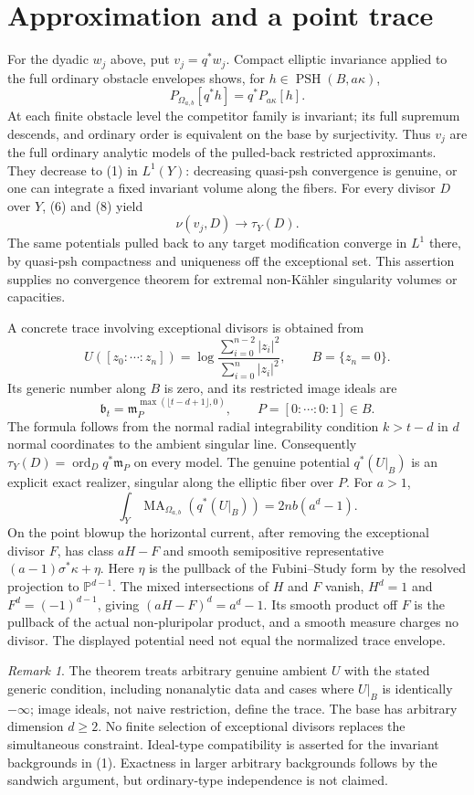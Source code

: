 \documentclass[11pt]{article}
\newcommand{\PSH}{\operatorname{PSH}}
\newcommand{\MA}{\operatorname{MA}}
\newcommand{\ord}{\operatorname{ord}}
\newcommand{\PP}{\mathbb P}
\theoremstyle{remark}\newtheorem{remark}[theorem]{Remark}
\begin{document}
\section{Approximation and a point trace}
For the dyadic $w_j$ above, put $v_j=q^*w_j$. Compact elliptic
invariance applied to the full ordinary obstacle envelopes shows,
for $h\in\PSH(B,a\kappa)$,
\[
 P_{\Omega_{a,b}}[q^*h]=q^*P_{a\kappa}[h].
\]
At each finite obstacle level the competitor family is invariant;
its full supremum descends, and ordinary order is equivalent on
the base by surjectivity. Thus $v_j$ are the full ordinary analytic
models of the pulled-back restricted approximants. They decrease
to (1) in $L^1(Y)$: decreasing quasi-psh convergence is genuine,
or one can integrate a fixed invariant volume along the fibers.
For every divisor $D$ over $Y$, (6) and (8) yield
\[
 \nu(v_j,D)\longrightarrow\tau_Y(D).
\]
The same potentials pulled back to any target modification converge
in $L^1$ there, by quasi-psh compactness and uniqueness off the
exceptional set. This assertion supplies no convergence theorem
for extremal non-K\"ahler singularity volumes or capacities.

A concrete trace involving exceptional divisors is obtained from
\[
 U([z_0:\cdots:z_n])
  =\log\frac{\sum_{i=0}^{n-2}|z_i|^2}{\sum_{i=0}^{n}|z_i|^2},
 \qquad B=\{z_n=0\}.
\]
Its generic number along $B$ is zero, and its restricted image
ideals are
\[
 \mathfrak b_t=\mathfrak m_P^{\max(\lfloor t-d+1\rfloor,0)},
 \qquad P=[0:\cdots:0:1]\in B.
\]
The formula follows from the normal radial integrability condition
$k>t-d$ in $d$ normal coordinates to the ambient singular line.
Consequently $\tau_Y(D)=\ord_Dq^*\mathfrak m_P$ on every model.
The genuine potential $q^*(U|_B)$ is an explicit exact realizer,
singular along the elliptic fiber over $P$. For $a>1$,
\[
 \int_Y\MA_{\Omega_{a,b}}(q^*(U|_B))=2nb(a^d-1).
\]
On the point blowup the horizontal current, after removing the
exceptional divisor $F$, has class $aH-F$ and smooth semipositive
representative $(a-1)\sigma^*\kappa+\eta$. Here $\eta$ is the
pullback of the Fubini--Study form by the resolved projection to
$\PP^{d-1}$. The mixed intersections of $H$ and $F$ vanish,
$H^d=1$ and $F^d=(-1)^{d-1}$, giving $(aH-F)^d=a^d-1$.
Its smooth product off $F$ is the pullback of the actual
non-pluripolar product, and a smooth measure charges no divisor.
The displayed potential need not equal the normalized trace envelope.

\begin{remark}
The theorem treats arbitrary genuine ambient $U$ with the stated
generic condition, including nonanalytic data and cases where
$U|_B$ is identically $-\infty$; image ideals, not naive restriction,
define the trace. The base has arbitrary dimension $d\ge2$. No finite selection
of exceptional divisors replaces the simultaneous constraint.
Ideal-type compatibility is asserted for the invariant backgrounds
in (1). Exactness in larger arbitrary backgrounds follows by the
sandwich argument, but ordinary-type independence is not claimed.
\end{remark}
\end{document}
